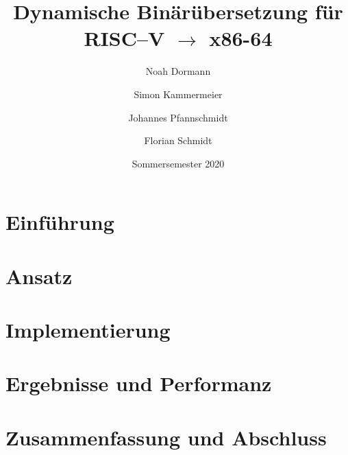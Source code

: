 \documentclass[course=eragp]{aspdoc}
\author{Noah Dormann \and Simon Kammermeier \and Johannes Pfannschmidt \and Florian Schmidt}
\date{Sommersemester 2020}
\title{Dynamische Binärübersetzung für RISC--V $\rightarrow$ x86-64}
\begin{document}
\maketitle
\tableofcontents
\pagebreak


\section{Einführung}

\section{Ansatz}

\section{Implementierung}

\section{Ergebnisse und Performanz}

\section{Zusammenfassung und Abschluss}



{}
\end{document}
